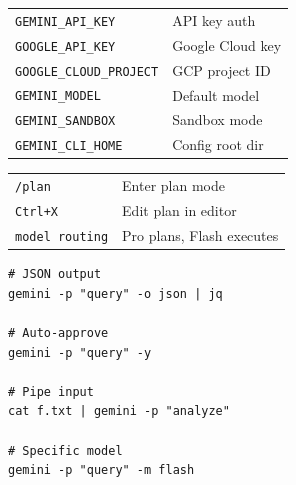 \documentclass[9pt]{extarticle}
\newcommand{\sect}[1]{\needspace{4\baselineskip}\vspace{6pt}{\footnotesize\bfseries\scshape #1}\par\vspace{2pt}}
\begin{document}
\begin{multicols}{3}
\sect{Environment Variables}
\begin{tabularx}{\linewidth}{@{}l@{\enspace}Y@{}}
\texttt{GEMINI\_API\_KEY}           & API key auth \\
\texttt{GOOGLE\_API\_KEY}           & Google Cloud key \\
\texttt{GOOGLE\_CLOUD\_PROJECT}     & GCP project ID \\
\texttt{GEMINI\_MODEL}              & Default model \\
\texttt{GEMINI\_SANDBOX}            & Sandbox mode \\
\texttt{GEMINI\_CLI\_HOME}          & Config root dir \\
\end{tabularx}

\sect{Plan Mode}
\begin{tabularx}{\linewidth}{@{}l@{\enspace}Y@{}}
\texttt{/plan}                       & Enter plan mode \\
\texttt{Ctrl+X}                      & Edit plan in editor \\
\texttt{model routing}               & Pro plans, Flash executes \\
\end{tabularx}

\sect{Headless Patterns}
{\footnotesize
\begin{verbatim}
# JSON output
gemini -p "query" -o json | jq

# Auto-approve
gemini -p "query" -y

# Pipe input
cat f.txt | gemini -p "analyze"

# Specific model
gemini -p "query" -m flash
\end{verbatim}
}

\end{multicols}
\end{document}
